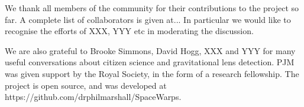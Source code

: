 We thank all \Ncollaboration members of the \sw community for their
contributions to the project so far. A complete list of collaborators is
given at... In particular we would like to recognise the efforts of XXX,
YYY etc in moderating the discussion.

We are also grateful to Brooke Simmons, David Hogg, XXX and YYY for many
useful conversations about citizen science and gravitational lens
detection. %
%
PJM was given support by the Royal  Society, in the form of a research
fellowship. 
%
%
%
%
The \sw project is open source, and was developed at
https://github.com/drphilmarshall/SpaceWarps.
